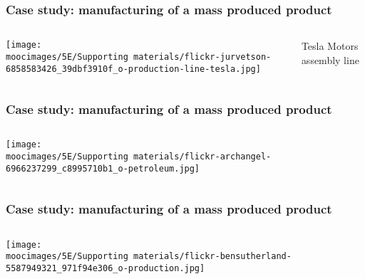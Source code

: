 \documentclass[handout,11pt,aspectratio=169,mathserif]{beamer}
\begin{document}

\begin{frame}\frametitle{Case study: manufacturing of a mass produced product}
	\begin{columns}[b]
				\centerline{\texttt{[image: \\moocimages/5E/Supporting materials/flickr-jurvetson-6858583426\_39dbf3910f\_o-production-line-tesla.jpg]}}
			Tesla Motors assembly line
	\end{columns}
\end{frame}

\begin{frame}\frametitle{Case study: manufacturing of a mass produced product}
	\begin{columns}[b]
 				\centerline{\texttt{[image: \\moocimages/5E/Supporting materials/flickr-archangel-6966237299\_c8995710b1\_o-petroleum.jpg]}}


	\end{columns}
\end{frame}
	
\begin{frame}\frametitle{Case study: manufacturing of a mass produced product}
	\begin{columns}[b]
				\centerline{\texttt{[image: \\moocimages/5E/Supporting materials/flickr-bensutherland-5587949321\_971f94e306\_o-production.jpg]}}

	\end{columns}
\end{frame}
\end{document}
